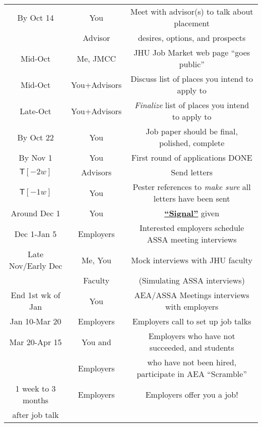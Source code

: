 \documentclass{econtex}
\begin{document}
\begin{center}
\begin{tabular}{|c|c|c|}
\\ \hline
By Oct 14 & You & Meet with advisor(s) to talk about placement 
\\ & Advisor & desires, options, and prospects
\\ \hline
Mid-Oct & Me, JMCC & JHU Job Market web page ``goes public''
\\ \hline
Mid-Oct & You+Advisors & Discuss list of places you intend to apply to
\\ \hline
Late-Oct & You+Advisors & {\it Finalize} list of places you intend to apply to
\\ \hline
By Oct 22 & You & Job paper should be final, polished, complete 
\\ \hline
By Nov 1 & You & First round of applications DONE
\\ \hline
$\mathsf{T}[-2w]$ & Advisors & Send letters 
\\ \hline
$\mathsf{T}[-1w]$ & You & Pester references to {\it make sure} all letters have been sent
\\ \hline %
Around Dec 1       &  You       & \href{http:/www.aeaweb.org/joe/signal/}{\bf ``Signal''} given   \\
Dec 1-Jan 5 &  Employers & Interested employers schedule ASSA meeting interviews
\\ \hline
Late Nov/Early Dec & Me, You & Mock interviews with JHU faculty
\\ & Faculty & (Simulating ASSA interviews)
\\ \hline
End 1st wk of Jan & You & AEA/ASSA Meetings interviews with employers
\\ \hline
Jan 10-Mar 20 & Employers & Employers call to set up job talks
\\ \hline
   Mar 20-Apr 15 & You and   & Employers who have not succeeded, and students 
\\               & Employers & who have not been hired, participate in AEA ``Scramble''
\\ \hline
1 week to 3 months  & Employers & Employers offer you a job!
\\ after job talk & & 
\\ \hline
\end{tabular}
\end{center}
\end{document}
